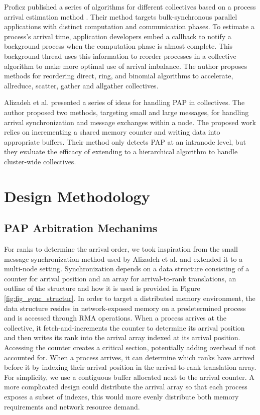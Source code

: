 Proficz published a series of algorithms for different collectives based on a process arrival estimation method \cite{Proficz2018ImprvAllReduceForImbPAP, Proficz2020PAPAwareScatterGather, Proficz2021AllGatherResilientToImbPAP}.
Their method targets bulk-synchronous parallel applications with distinct computation and communication phases.
To estimate a process's arrival time, application developers embed a callback to notify a background process when the computation phase is almost complete.
This background thread uses this information to reorder processes in a collective algorithm to make more optimal use of arrival imbalance.
The author proposes methods for reordering direct, ring, and binomial algorithms to accelerate, allreduce, scatter, gather and allgather collectives.

Alizadeh et al. \cite{Alizadeh2022PAPCollDL} presented a series of ideas for handling \gls{PAP} in collectives. 
The author proposed two methods, targeting small and large messages, for handling arrival synchronization and message exchanges within a node.
The proposed work relies on incrementing a shared memory counter and writing data into appropriate buffers.
Their method only detects \gls{PAP} at an intranode level, but they evaluate the efficacy of extending to a hierarchical algorithm to handle cluster-wide collectives.

\section{Design Methodology}
\subsection{PAP Arbitration Mechanims}
For ranks to determine the arrival order, we took inspiration from the small message synchronization method used by Alizadeh et al. \cite{Alizadeh2022PAPCollDL} and extended it to a multi-node setting.
Synchronization depends on a data structure consisting of a counter for arrival position and an array for arrival-to-rank translations, an outline of the structure and how it is used is provided in Figure \ref{fig:fig_sync_structur}.
In order to target a distributed memory environment, the data structure resides in network-exposed memory on a predetermined process and is accessed through \gls{RMA} operations.
When a process arrives at the collective, it fetch-and-increments the counter to determine its arrival position and then writes its rank into the arrival array indexed at its arrival position.
Accessing the counter creates a critical section, potentially adding overhead if not accounted for.
When a process arrives, it can determine which ranks have arrived before it by indexing their arrival position in the arrival-to-rank translation array.
For simplicity, we use a contiguous buffer allocated next to the arrival counter.
A more complicated design could distribute the arrival array so that each process exposes a subset of indexes, this would more evenly distribute both memory requirements and network resource demand.

